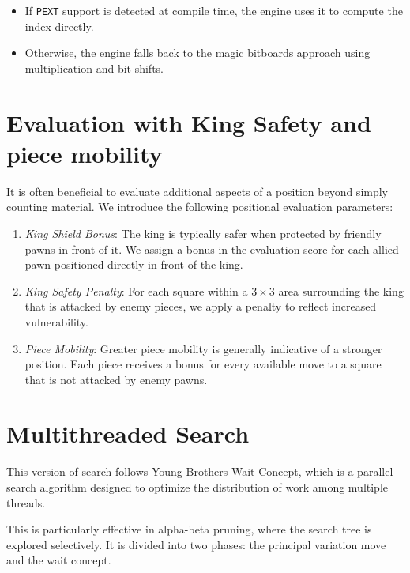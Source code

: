 \begin{itemize}[itemsep=1pt]
  \item If \texttt{PEXT} support is detected at compile time, the engine uses it to compute the index directly.
  \item Otherwise, the engine falls back to the magic bitboards approach using multiplication and bit shifts.
\end{itemize}

\section{Evaluation with King Safety and piece mobility}

It is often beneficial to evaluate additional aspects of a position beyond simply counting material. We introduce the following positional evaluation parameters:

\begin{enumerate}
    \item \textit{King Shield Bonus}: The king is typically safer when protected by friendly pawns in front of it. We assign a bonus in the evaluation score for each allied pawn positioned directly in front of the king.

    \item \textit{King Safety Penalty}: For each square within a $3 \times 3$ area surrounding the king that is attacked by enemy pieces, we apply a penalty to reflect increased vulnerability.

    \item \textit{Piece Mobility}: Greater piece mobility is generally indicative of a stronger position. Each piece receives a bonus for every available move to a square that is not attacked by enemy pawns.
\end{enumerate}

\section{Multithreaded Search}

This version of search follows Young Brothers Wait Concept, which is a parallel search algorithm designed to optimize the distribution of work among multiple threads.

\vspace{1em}

\noindent This is particularly effective in alpha-beta pruning, where the search tree is explored selectively. It is divided into two phases: the principal variation move and the wait concept.

